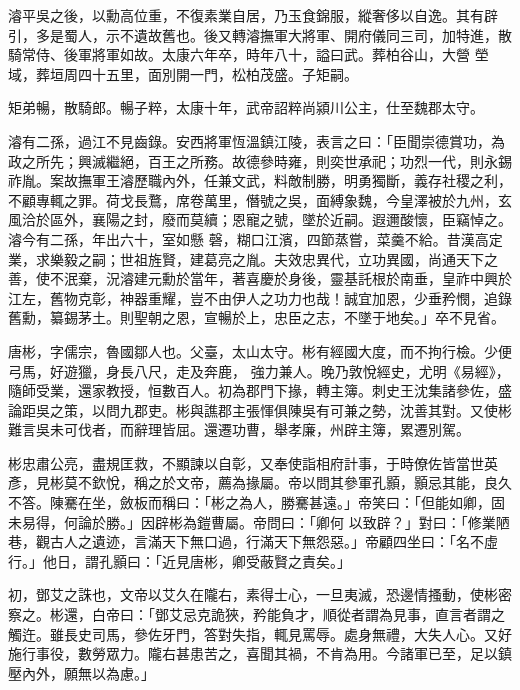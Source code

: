 \begin{pinyinscope}
 濬平吳之後，以勳高位重，不復素業自居，乃玉食錦服，縱奢侈以自逸。其有辟引，多是蜀人，示不遺故舊也。後又轉濬撫軍大將軍、開府儀同三司，加特進，散騎常侍、後軍將軍如故。太康六年卒，時年八十，謚曰武。葬柏谷山，大營
 塋域，葬垣周四十五里，面別開一門，松柏茂盛。子矩嗣。



 矩弟暢，散騎郎。暢子粹，太康十年，武帝詔粹尚潁川公主，仕至魏郡太守。



 濬有二孫，過江不見齒錄。安西將軍恆溫鎮江陵，表言之曰：「臣聞崇德賞功，為政之所先；興滅繼絕，百王之所務。故德參時雍，則奕世承祀；功烈一代，則永錫祚胤。案故撫軍王濬歷職內外，任兼文武，料敵制勝，明勇獨斷，義存社稷之利，不顧專輒之罪。荷戈長鶩，席卷萬里，僭號之吳，面縛象魏，今皇澤被於九州，玄風洽於區外，襄陽之封，廢而莫續；恩寵之號，墜於近嗣。遐邇酸懷，臣竊悼之。濬今有二孫，年出六十，室如懸
 磬，糊口江濱，四節蒸嘗，菜羹不給。昔漢高定業，求樂毅之嗣；世祖旌賢，建葛亮之胤。夫效忠異代，立功異國，尚通天下之善，使不泯棄，況濬建元勳於當年，著喜慶於身後，靈基託根於南垂，皇祚中興於江左，舊物克彰，神器重耀，豈不由伊人之功力也哉！誠宜加恩，少垂矜憫，追錄舊勳，纂錫茅土。則聖朝之恩，宣暢於上，忠臣之志，不墜于地矣。」卒不見省。



 唐彬，字儒宗，魯國鄒人也。父臺，太山太守。彬有經國大度，而不拘行檢。少便弓馬，好遊獵，身長八尺，走及奔鹿，
 強力兼人。晚乃敦悅經史，尤明《易經》，隨師受業，還家教授，恒數百人。初為郡門下掾，轉主簿。刺史王沈集諸參佐，盛論距吳之策，以問九郡吏。彬與譙郡主張惲俱陳吳有可兼之勢，沈善其對。又使彬難言吳未可伐者，而辭理皆屈。還遷功曹，舉孝廉，州辟主簿，累遷別駕。



 彬忠肅公亮，盡規匡救，不顯諫以自彰，又奉使詣相府計事，于時僚佐皆當世英彥，見彬莫不欽悅，稱之於文帝，薦為掾屬。帝以問其參軍孔顥，顥忌其能，良久不答。陳騫在坐，斂板而稱曰：「彬之為人，勝騫甚遠。」帝笑曰：「但能如卿，固未易得，何論於勝。」因辟彬為鎧曹屬。帝問曰：「卿何
 以致辟？」對曰：「修業陋巷，觀古人之遺迹，言滿天下無口過，行滿天下無怨惡。」帝顧四坐曰：「名不虛行。」他日，謂孔顥曰：「近見唐彬，卿受蔽賢之責矣。」



 初，鄧艾之誅也，文帝以艾久在隴右，素得士心，一旦夷滅，恐邊情搔動，使彬密察之。彬還，白帝曰：「鄧艾忌克詭狹，矜能負才，順從者謂為見事，直言者謂之觸迕。雖長史司馬，參佐牙門，答對失指，輒見罵辱。處身無禮，大失人心。又好施行事役，數勞眾力。隴右甚患苦之，喜聞其禍，不肯為用。今諸軍已至，足以鎮壓內外，願無以為慮。」




\end{pinyinscope}

